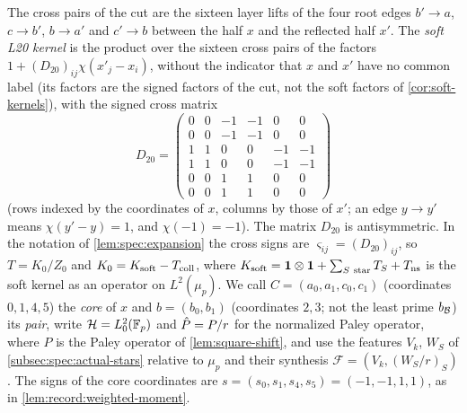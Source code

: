 The cross pairs of the cut are the sixteen layer lifts of the four root edges
$b'\to a$, $c\to b'$, $b\to a'$ and $c'\to b$ between the half $x$ and the
reflected half $x'$. The \emph{soft L20 kernel} is the product over the
sixteen cross pairs of the factors $1+(D_{20})_{ij}\chi(x'_j-x_i)$, without the
indicator that $x$ and $x'$ have no common label (its factors are the signed
factors of the cut, not the soft factors of \cref{cor:soft-kernels}), with the
signed cross matrix
\begin{equation}\label{eq:l20-cross-matrix}
 D_{20}=\begin{pmatrix}
 0&0&-1&-1&0&0\\0&0&-1&-1&0&0\\
 1&1&0&0&-1&-1\\1&1&0&0&-1&-1\\
 0&0&1&1&0&0\\0&0&1&1&0&0
 \end{pmatrix}
\end{equation}
(rows indexed by the coordinates of $x$, columns by those of $x'$; an edge
$y\to y'$ means $\chi(y'-y)=1$, and $\chi(-1)=-1$). The matrix $D_{20}$ is
antisymmetric. In the notation of \cref{lem:spec:expansion} the cross signs are
$\varsigma_{ij}=(D_{20})_{ij}$, so $T=K_0/Z_0$ and $K_0=K_{\rm soft}-T_{\rm coll}$,
where $K_{\rm soft}=\one\otimes\one+\sum_{S\ \rm star}T_S+T_{\rm ns}$ is the soft
kernel as an operator on $L^2(\mu_p)$. We call $C=(a_0,a_1,c_0,c_1)$
(coordinates $0,1,4,5$) the \emph{core} of $x$ and $b=(b_0,b_1)$ (coordinates
$2,3$; not the least prime $b_{\mathcal B}$) its \emph{pair}, write $\mathcal H=L^2_0(\mathbb F_p)$ and $\hat P=P/r$ for the
normalized Paley operator, where $P$ is the Paley operator of
\cref{lem:square-shift}, and use the features $V_k$, $W_S$ of
\cref{subsec:spec:actual-stars} relative to $\mu_p$ and their synthesis
$\mathcal F=(V_k,(W_S/r)_S)$. The signs of the core coordinates are
$s=(s_0,s_1,s_4,s_5)=(-1,-1,1,1)$, as in \cref{lem:record:weighted-moment}.

